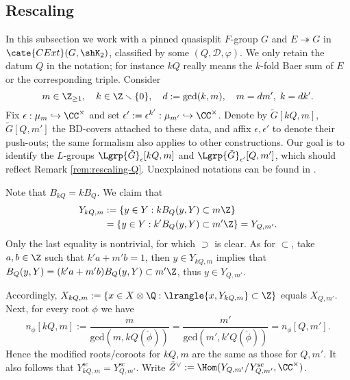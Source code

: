 \documentclass[a4paper,10pt]{article}
\begin{document}
\subsection{Rescaling}\label{sec:rescaling}
In this subsection we work with a pinned quasisplit $F$-group $G$ and $E \twoheadrightarrow G$ in $\cate{CExt}(G, \shK_2)$, classified by some $(Q, \mathcal{D}, \varphi)$. We only retain the datum $Q$ in the notation; for instance $kQ$ really means the $k$-fold Baer sum of $E$ or the corresponding triple. Consider
\[ m \in \Z_{\geq 1}, \quad k \in \Z \smallsetminus \{0\}, \quad d := \text{gcd}(k,m), \quad m = dm', \; k = dk'. \]
Fix $\epsilon: \mu_m \hookrightarrow \CC^\times$ and set $\epsilon' := \epsilon^{k'}: \mu_{m'} \hookrightarrow \CC^\times$. Denote by $\tilde{G}[kQ, m]$, $\tilde{G}[Q, m']$ the BD-covers attached to these data, and affix $\epsilon, \epsilon'$ to denote their push-outs; the same formalism also applies to other constructions. Our goal is to identify the $L$-groups $\Lgrp{\tilde{G}}_\epsilon[kQ,m]$ and $\Lgrp{\tilde{G}}_{\epsilon'}[Q, m']$, which should reflect Remark \ref{rem:rescaling-Q}. Unexplained notations can be found in \cite[\S 3]{Weis17}.

Note that $B_{kQ} = kB_Q$. We claim that
\begin{align*}
	Y_{kQ,m} & := \left\{ y \in Y: kB_Q(y,Y) \subset m\Z \right\} \\
	& = \left\{ y \in Y: k' B_Q(y,Y) \subset m'\Z \right\} = Y_{Q,m'}.
\end{align*}
Only the last equality is nontrivial, for which $\supset$ is clear. As for $\subset$, take $a,b \in \Z$ such that $k' a + m' b = 1$, then $y \in Y_{kQ,m}$ implies that $B_Q(y,Y) = (k'a + m'b) B_Q(y,Y) \subset m'\Z$, thus $y \in Y_{Q,m'}$.

Accordingly, $X_{kQ, m} := \left\{x \in X \otimes \Q: \lrangle{x, Y_{kQ,m}} \subset \Z \right\}$ equals $X_{Q,m'}$. Next, for every root $\phi$ we have
\[ n_\phi[kQ, m] := \dfrac{m}{\text{gcd}(m, kQ(\check{\phi}))} = \dfrac{m'}{\text{gcd}(m', k'Q(\check{\phi}))} = n_\phi[Q, m']. \]
Hence the modified roots/coroots for $kQ, m$ are the same as those for $Q, m'$. It also follows that $Y_{kQ, m}^\text{sc} = Y_{Q, m'}^\text{sc}$. Write $\tilde{Z}^\vee := \Hom(Y_{Q,m'}/Y^\text{sc}_{Q,m'}, \CC^\times)$.
\end{document}
